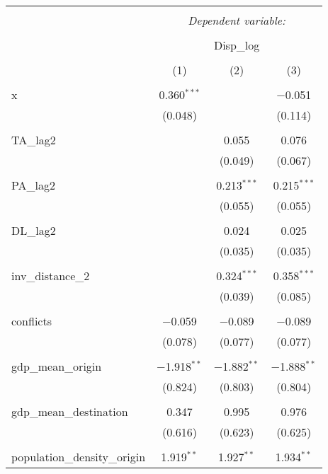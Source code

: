 
\begin{table}[!htbp] \centering 
  \caption{} 
  \label{} 
\begin{tabular}{@{\extracolsep{5pt}}lccc} 
\\[-1.8ex]\hline 
\hline \\[-1.8ex] 
 & \multicolumn{3}{c}{\textit{Dependent variable:}} \\ 
\cline{2-4} 
\\[-1.8ex] & \multicolumn{3}{c}{Disp\_log} \\ 
\\[-1.8ex] & (1) & (2) & (3)\\ 
\hline \\[-1.8ex] 
 x & 0.360$^{***}$ &  & $-$0.051 \\ 
  & (0.048) &  & (0.114) \\ 
  & & & \\ 
 TA\_lag2 &  & 0.055 & 0.076 \\ 
  &  & (0.049) & (0.067) \\ 
  & & & \\ 
 PA\_lag2 &  & 0.213$^{***}$ & 0.215$^{***}$ \\ 
  &  & (0.055) & (0.055) \\ 
  & & & \\ 
 DL\_lag2 &  & 0.024 & 0.025 \\ 
  &  & (0.035) & (0.035) \\ 
  & & & \\ 
 inv\_distance\_2 &  & 0.324$^{***}$ & 0.358$^{***}$ \\ 
  &  & (0.039) & (0.085) \\ 
  & & & \\ 
 conflicts & $-$0.059 & $-$0.089 & $-$0.089 \\ 
  & (0.078) & (0.077) & (0.077) \\ 
  & & & \\ 
 gdp\_mean\_origin & $-$1.918$^{**}$ & $-$1.882$^{**}$ & $-$1.888$^{**}$ \\ 
  & (0.824) & (0.803) & (0.804) \\ 
  & & & \\ 
 gdp\_mean\_destination & 0.347 & 0.995 & 0.976 \\ 
  & (0.616) & (0.623) & (0.625) \\ 
  & & & \\ 
 population\_density\_origin & 1.919$^{**}$ & 1.927$^{**}$ & 1.934$^{**}$ \\ 

\end{tabular}
\end{table}
